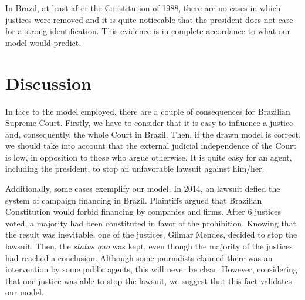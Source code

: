 \documentclass[12pt, a4paper]{article}
\begin{document}
In Brazil, at least after the Constitution of 1988, there are no cases in which justices were removed and it is quite noticeable that the president does not care for a strong identification. This evidence is in complete accordance to what our model would predict. 




 

\section{Discussion}

In face to the model employed, there are a couple of consequences for Brazilian Supreme Court. Firstly, we have to consider that it is easy to influence a justice and, consequently, the whole Court in Brazil. Then, if the drawn model is correct, we should take into account that the external judicial independence of the Court is low, in opposition to those who argue otherwise. It is quite easy for an agent, including the president, to stop an unfavorable lawsuit against him/her.

Additionally, some cases exemplify our model. In 2014, an lawsuit defied the system of campaign financing in Brazil. Plaintiffs argued that Brazilian Constitution would forbid financing by companies and firms. After 6 justices voted, a majority had been constituted in favor of the prohibition. Knowing that the result was inevitable, one of the justices, Gilmar Mendes, decided to stop the lawsuit. Then, the \textit{status quo} was kept, even though the majority of the justices had reached a conclusion. Although some journalists claimed there was an intervention by some public agents, this will never be clear. However, considering that one justice was able to stop the lawsuit, we suggest that this fact validates our model.
\end{document}
